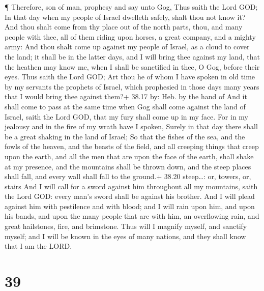  ¶ Therefore, son of man, prophesy and say unto Gog, Thus
saith the Lord GOD; In that day when my people of Israel dwelleth
safely, shalt thou not know it?  And thou shalt come from
thy place out of the north parts, thou, and many people with thee, all
of them riding upon horses, a great company, and a mighty army:
 And thou shalt come up against my people of Israel, as a
cloud to cover the land; it shall be in the latter days, and I will
bring thee against my land, that the heathen may know me, when I shall
be sanctified in thee, O Gog, before their eyes.  Thus
saith the Lord GOD; Art thou he of whom I have spoken in old time by my
servants the prophets of Israel, which prophesied in those days many
years that I would bring thee against them?+ 38.17 by: Heb. by the hand
of  And it shall come to pass at the same time when Gog
shall come against the land of Israel, saith the Lord GOD, that my fury
shall come up in my face.  For in my jealousy and in the
fire of my wrath have I spoken, Surely in that day there shall be a
great shaking in the land of Israel;  So that the fishes of
the sea, and the fowls of the heaven, and the beasts of the field, and
all creeping things that creep upon the earth, and all the men that are
upon the face of the earth, shall shake at my presence, and the
mountains shall be thrown down, and the steep places shall fall, and
every wall shall fall to the ground.+ 38.20 steep\ldots: or, towers, or,
stairs  And I will call for a sword against him throughout
all my mountains, saith the Lord GOD: every man's sword shall be against
his brother.  And I will plead against him with pestilence
and with blood; and I will rain upon him, and upon his bands, and upon
the many people that are with him, an overflowing rain, and great
hailstones, fire, and brimstone.  Thus will I magnify
myself, and sanctify myself; and I will be known in the eyes of many
nations, and they shall know that I am the LORD.

\hypertarget{section-38}{%
\section{39}\label{section-38}}


